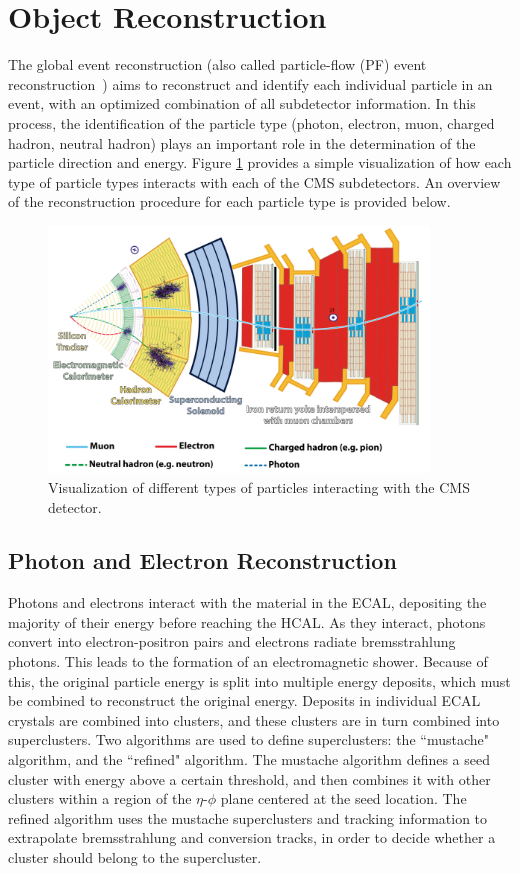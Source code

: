 \section{Object Reconstruction}
The global event reconstruction (also called particle-flow (PF) event reconstruction~\cite{CMS:2017yfk}) aims to reconstruct and identify each individual particle in an event, with an optimized combination of all subdetector information. In this process, the identification of the particle type (photon, electron, muon, charged hadron, neutral hadron) plays an important role in the determination of the particle direction and energy. Figure \ref{fig:particles_interact} provides a simple visualization of how each type of particle types interacts with each of the CMS subdetectors. An overview of the reconstruction procedure for each particle type is provided below.

\begin{figure}[tb]
  \centering
   \includegraphics[width=0.9\textwidth]{fig/experiment/reconstruction/cms_detector.png}
	\caption{Visualization of different types of particles interacting with the CMS detector.}
	\label{fig:particles_interact}
\end{figure}

\subsection{Photon and Electron Reconstruction}
Photons and electrons interact with the material in the ECAL, depositing the majority of their energy before reaching the HCAL. As they interact, photons convert into 
electron-positron pairs and electrons radiate bremsstrahlung photons. This leads to the formation of an electromagnetic shower. Because of this, the original particle energy 
is split into multiple energy deposits, which must be combined to reconstruct the original energy. Deposits in individual ECAL crystals are combined into clusters, 
and these clusters are in turn combined into superclusters. Two algorithms are used to define superclusters: the ``mustache" algorithm, and the ``refined" algorithm.
The mustache algorithm defines a seed cluster with energy above a certain threshold, and then combines it with other clusters within a region of the $\eta$-$\phi$ plane centered at the 
seed location. The refined algorithm uses the mustache superclusters and tracking information to extrapolate bremsstrahlung and conversion tracks, in order to decide whether a cluster should belong 
to the supercluster. 

